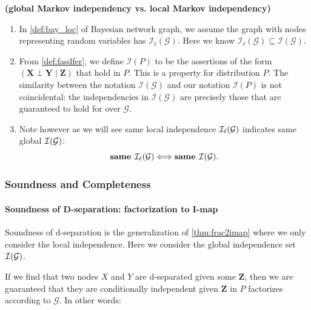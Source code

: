 \documentclass{article}
\newcommand{\bfs}[1]{\textbf{({#1}) }}
\begin{document}
\begin{rema}\bfs{global Markov independency vs. local Markov independency}
\begin{enumerate}
    \item In \cref{def:bay_loc} of Bayesian network graph, we assume the graph with nodes representing random variables has  $\mathcal{I}_{\ell}(\mathcal{G})$. Here we know $\mathcal{I}_{\ell}(\mathcal{G})\subseteq \mathcal{I}(\mathcal{G})$. 
    \item From \cref{def:fasdfer}, we define $\mathcal{I}(P)$ to be the  assertions of the form $(\boldsymbol{X} \perp \boldsymbol{Y} \mid \boldsymbol{Z})$ that hold in $P$. This is a  property for distribution $P$.  The similarity between the notation $\mathcal{I}(\mathcal{G})$ and our notation $\mathcal{I}(P)$ is not coincidental:  the independencies in $\mathcal{I}(\mathcal{G})$ are precisely those that are guaranteed to hold for  over $\mathcal{G}$.
    \item Note however as we will see same local independence $\mathcal{I}_\ell(\mathcal{G})$ indicates same global $\mathcal{I}(\mathcal{G})$:
    $$\text{\textbf{same $\mathcal{I}_\ell(\mathcal{G})$}}\Longleftrightarrow \text{\textbf{same $\mathcal{I}(\mathcal{G})$}}.$$
\end{enumerate}
\end{rema}


\subsubsection{Soundness and Completeness}


\paragraph{Soundness of D-separation: factorization to I-map}
Soundness of d-separation is the generalization of \cref{thm:frac2imap} where we only consider the local independence. Here we consider the global independence set $\mathcal{I}(\mathcal{G})$. 

 If we find that two nodes $X$ and $Y$ are d-separated given some $\boldsymbol{Z}$, then we are guaranteed that they are conditionally independent given $\boldsymbol{Z}$ in   $P$ factorizes according to $\mathcal{G}$. In other words:
\end{document}
